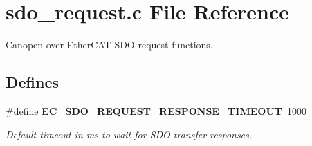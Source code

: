 \section{sdo\-\_\-request.\-c \-File \-Reference}
\label{sdo__request_8c}


\-Canopen over \-Ether\-C\-A\-T \-S\-D\-O request functions.  


\subsection*{\-Defines}
\begin{DoxyCompactItemize}
\item 
\#define {\bf \-E\-C\-\_\-\-S\-D\-O\-\_\-\-R\-E\-Q\-U\-E\-S\-T\-\_\-\-R\-E\-S\-P\-O\-N\-S\-E\-\_\-\-T\-I\-M\-E\-O\-U\-T}~1000\label{sdo__request_8c_a90de0444ea60b7bb1d18233f1152b249}

\begin{DoxyCompactList}\small\item\em \-Default timeout in ms to wait for \-S\-D\-O transfer responses. \end{DoxyCompactList}\end{DoxyCompactItemize}

